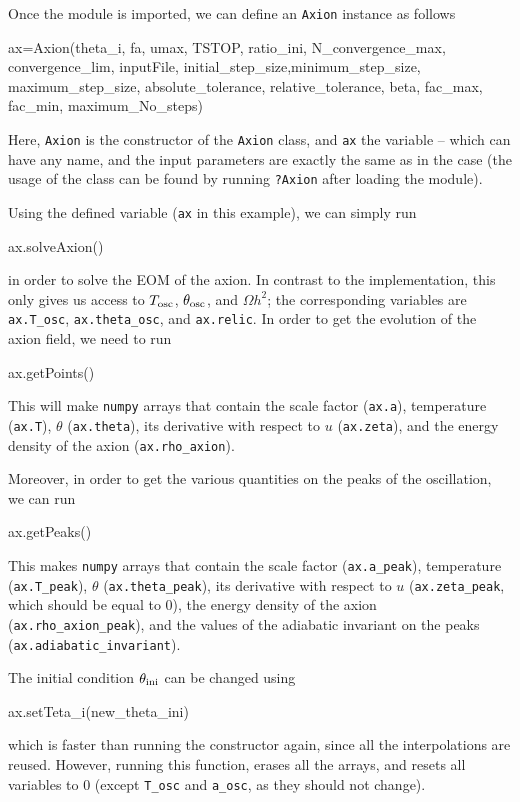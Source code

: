 \documentclass[11pt,a4paper]{article}
\begin{document}
Once the module is imported, we can define an {\tt Axion} instance as follows 
%
\begin{py}
	ax=Axion(theta_i, fa, umax, TSTOP, ratio_ini, N_convergence_max, convergence_lim, inputFile,
	initial_step_size,minimum_step_size, maximum_step_size, absolute_tolerance, 
	relative_tolerance, beta, fac_max, fac_min, maximum_No_steps)
\end{py}
%
Here, {\tt Axion} is the constructor of the {\tt Axion} class, and {\tt ax} the variable -- which can have any name, and the input parameters are exactly the same as in the \CPP case (the usage of the class can be found by running {\tt ?Axion} after loading the module). 

Using the defined variable ({\tt ax} in this example), we can simply run  
%
\begin{py}
	ax.solveAxion()
\end{py}
%
in order to solve the EOM of the axion. In contrast to the \CPP implementation, this only gives us access to $T_{\rm osc}{}$, $\theta_{\rm osc}{}$, and $\Omega h^2$; the corresponding variables are {\tt ax.T\_osc}, {\tt ax.theta\_osc}, and {\tt ax.relic}. In order to get the evolution of the axion field, we need to run 
%
\begin{py}
	ax.getPoints()
\end{py}
%
This will make {\tt numpy} arrays that contain the scale factor ({\tt ax.a}), temperature ({\tt ax.T}), $\theta$ ({\tt ax.theta}), its derivative with respect to $u$ ({\tt ax.zeta}), and the energy density of the axion ({\tt ax.rho\_axion}).

Moreover, in order to get the various quantities on the peaks of the oscillation, we can run
%
\begin{py}
	ax.getPeaks()
\end{py}
%
This makes {\tt numpy} arrays that contain the scale factor ({\tt ax.a\_peak}), temperature ({\tt ax.T\_peak}), $\theta$ ({\tt ax.theta\_peak}), its derivative with respect to $u$ ({\tt ax.zeta\_peak}, which should be equal to $0$), the energy density of the axion ({\tt ax.rho\_axion\_peak}), and the values of the adiabatic invariant on the peaks ({\tt ax.adiabatic\_invariant}).

The initial condition $\theta_{\rm ini}{}$ can be changed using 
%
\begin{py}
	ax.setTeta_i(new_theta_ini)
\end{py}
%
which is faster than running the constructor again, since all the interpolations are reused. However, running this function, erases all the arrays, and resets all variables to $0$ (except {\tt T\_osc} and {\tt a\_osc}, as they should not change). 
\end{document}
